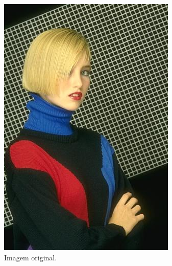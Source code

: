   \begin{figure}[!htb]
       \begin{center}  
          \includegraphics[width=0.3\columnwidth]{img/198023.jpg}
           \caption{\label{fig:Berkeley_mulher}Imagem original. \citep{Arbelez2011}}
       \end{center}
   \end{figure}

